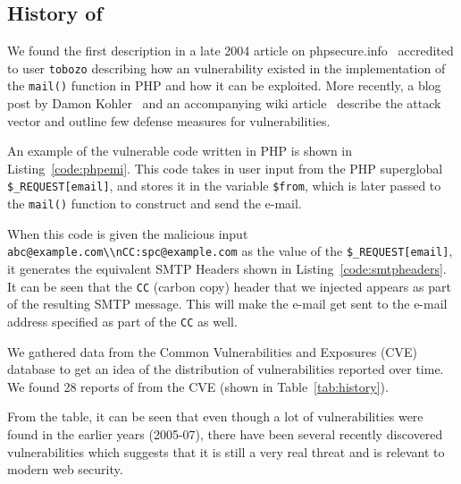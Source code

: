 \subsection{History of \ehi}

We found the first \ehi description in a late 2004 article on phpsecure.info~\cite{Tobozo} accredited to user \lstinline|tobozo| describing how an \ehi vulnerability existed in the implementation of the \texttt{mail()} function in PHP and how it can be exploited. More recently, a blog post by Damon Kohler~\cite{DK} and an accompanying wiki article~\cite{Injection} describe the attack vector and outline few defense measures for \ehi vulnerabilities.


An example of the vulnerable code written in PHP is shown in Listing~\ref{code:phpemi}. This code takes in user input from the PHP superglobal \texttt{\$\_REQUEST[\textquotesingle email\textquotesingle]}, and stores it in the variable \texttt{\$from}, which is later passed to the \texttt{mail()} function to construct and send the e-mail.



\begin{sloppypar}
When this code is given the malicious input \texttt{\lstinline{abc@example.com\\nCC:spc@example.com}} as the value of the \texttt{\$\_REQUEST[\textquotesingle email\textquotesingle]}, it generates the equivalent SMTP Headers shown in Listing~\ref{code:smtpheaders}. It can be seen that the \texttt{CC} (carbon copy) header that we injected appears as part of the resulting SMTP message. This will make the e-mail get sent to the e-mail address specified as part of the \texttt{CC} as well. 

%
\end{sloppypar}

We gathered data from the Common Vulnerabilities and Exposures (CVE)~\cite{cve} database to get an idea of the distribution of \ehi vulnerabilities reported over time. We found 28 reports of \ehi from the CVE (shown in Table~\ref*{tab:history}).

From the table, it can be seen that even though a lot of \ehi vulnerabilities were found in the earlier years (2005-07), there have been several recently discovered \ehi vulnerabilities which suggests that it is still a very real threat and is relevant to modern web security.


